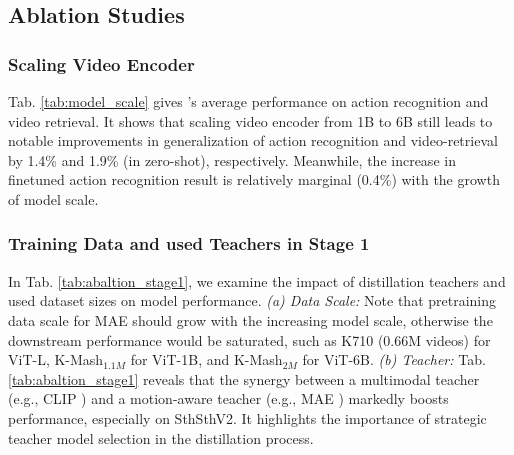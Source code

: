 \subsection{Ablation Studies} \label{sec:ab}

\subsubsection{Scaling Video Encoder} Tab. \ref{tab:model_scale} gives {\modelname}'s average performance on action recognition and video retrieval. It shows that scaling video encoder from 1B to 6B still leads to notable  improvements in generalization of action recognition and video-retrieval by 1.4\% and 1.9\% (in zero-shot), respectively. Meanwhile, the increase in finetuned action recognition result is relatively marginal (0.4\%) with the growth of model scale.


\subsubsection{Training Data and used Teachers in Stage 1} \label{sec:ab_kmash}
In Tab. \ref{tab:abaltion_stage1}, we examine the impact of distillation teachers and used dataset sizes on model performance.
\textit{(a) Data Scale:} 
Note that pretraining data scale for MAE should grow with the increasing model scale, otherwise the downstream performance would be saturated, such as K710 (0.66M videos) for ViT-L, K-Mash$_{1.1M}$ for ViT-1B, and K-Mash$_{2M}$ for ViT-6B.
\textit{(b) Teacher:} Tab. \ref{tab:abaltion_stage1} reveals that the synergy between a multimodal teacher (e.g., CLIP \cite{clip}) and a motion-aware teacher (e.g., MAE \cite{videomae}) markedly boosts performance, 
especially on SthSthV2. It highlights the importance of strategic teacher model selection in the distillation process.

\begin{table}[t]
\vspace{-2mm}
\caption{Ablation of Stage2. All models are tested with 8$\times$224$\times$224 input. 
}
\centering
\small
{}
\label{tab:ab_stage2}
\end{table}

